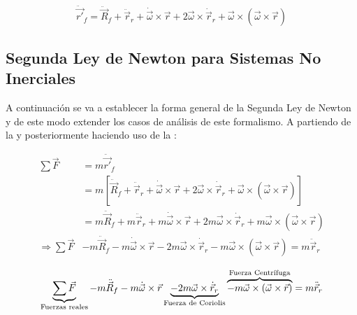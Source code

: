 \documentclass[/home/hernan/Documentos/Apuntes_mecanica_teorica/main.tex]{subfiles}
\begin{document}
	\begin{definition}
		\begin{equation}
			\ddot{ \vec{{r}'}}_{f}  = \ddot{\vec{R}}_{f} + \ddot{ \vec{r}}_{r} + \dot{\vec{\omega}} \times \vec{r}  + 2\vec{\omega} \times \dot{ \vec{r}}_{r} + \vec{\omega} \times \left( \vec{\omega} \times \vec{r}  \right)
			\label{eq: ainirelation}
		\end{equation}
	\end{definition}

	\subsection{Segunda Ley de Newton para Sistemas No Inerciales}

	A continuación se va a establecer la forma general de la Segunda Ley de Newton y de este modo extender los casos de análisis de este formalismo. A partiendo de la  y posteriormente haciendo uso de la :

	\begin{align*}
		\sum \vec{F} &= m \ddot{\vec{{r}'}}_{f} \\
		& = m \left[ \ddot{\vec{R}}_{f} + \ddot{ \vec{r}}_{r} + \dot{\vec{\omega}} \times \vec{r}  + 2\vec{\omega} \times \dot{ \vec{r}}_{r} + \vec{\omega} \times \left( \vec{\omega} \times \vec{r}  \right) \right] \\ 
		& = m\ddot{\vec{R}}_{f} + m\ddot{ \vec{r}}_{r} + m \dot{\vec{\omega}} \times \vec{r} + 2m \vec{\omega} \times \dot{ \vec{r}}_{r} + m \vec{\omega} \times \left( \vec{\omega} \times \vec{r}  \right) \\ 
		\Rightarrow \sum \vec{F} & - m\ddot{\vec{R}}_{f} -  m \dot{\vec{\omega}} \times \vec{r} - 2m \vec{\omega} \times \dot{ \vec{r}}_{r} - m \vec{\omega} \times \left( \vec{\omega} \times \vec{r}  \right) = m\ddot{ \vec{r}}_{r}
	\end{align*}

	\begin{definition}
		\begin{equation}
			\underbrace{\sum \vec{F}}_{\textup{Fuerzas reales}} - m\ddot{\vec{R}}_{f} -  m \dot{\vec{\omega}} \times \vec{r} \underbrace{- 2m \vec{\omega} \times \dot{ \vec{r}}_{r}}_{\textup{Fuerza de Coriolis}}  \overbrace{- m \vec{\omega} \times \left( \vec{\omega} \times \vec{r}  \right)}^{\textup{Fuerza Centrífuga}} = m\ddot{ \vec{r}}_{r}
			\label{eq: NSecondlawnoinertial}
		\end{equation}
	\end{definition}
	
\end{document}
